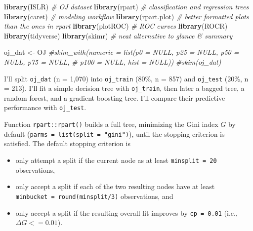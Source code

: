 \documentclass[
]{book}
\newenvironment{Shaded}{\begin{snugshade}}{\end{snugshade}}
\newcommand{\CommentTok}[1]{\textcolor[rgb]{0.56,0.35,0.01}{\textit{#1}}}
\newcommand{\DataTypeTok}[1]{\textcolor[rgb]{0.13,0.29,0.53}{#1}}
\newcommand{\DecValTok}[1]{\textcolor[rgb]{0.00,0.00,0.81}{#1}}
\newcommand{\FloatTok}[1]{\textcolor[rgb]{0.00,0.00,0.81}{#1}}
\newcommand{\KeywordTok}[1]{\textcolor[rgb]{0.13,0.29,0.53}{\textbf{#1}}}
\newcommand{\NormalTok}[1]{#1}
\newcommand{\OperatorTok}[1]{\textcolor[rgb]{0.81,0.36,0.00}{\textbf{#1}}}
\newcommand{\OtherTok}[1]{\textcolor[rgb]{0.56,0.35,0.01}{#1}}
\newcommand{\StringTok}[1]{\textcolor[rgb]{0.31,0.60,0.02}{#1}}
\providecommand{\tightlist}{%
  \setlength{\itemsep}{0pt}\setlength{\parskip}{0pt}}
\begin{document}
\begin{Shaded}
\begin{Highlighting}[]
\KeywordTok{library}\NormalTok{(ISLR)  }\CommentTok{# OJ dataset}
\KeywordTok{library}\NormalTok{(rpart)  }\CommentTok{# classification and regression trees }
\KeywordTok{library}\NormalTok{(caret)  }\CommentTok{# modeling workflow}
\KeywordTok{library}\NormalTok{(rpart.plot)  }\CommentTok{# better formatted plots than the ones in rpart}
\KeywordTok{library}\NormalTok{(plotROC)  }\CommentTok{# ROC curves}
\KeywordTok{library}\NormalTok{(ROCR)}
\KeywordTok{library}\NormalTok{(tidyverse)}
\KeywordTok{library}\NormalTok{(skimr)  }\CommentTok{# neat alternative to glance & summary}

\NormalTok{oj_dat <-}\StringTok{ }\NormalTok{OJ}
\CommentTok{#skim_with(numeric = list(p0 = NULL, p25 = NULL, p50 = NULL, p75 = NULL, }
\CommentTok{#                                p100 = NULL, hist = NULL))}
\CommentTok{#skim(oj_dat)}
\end{Highlighting}
\end{Shaded}

I'll split \texttt{oj\_dat} (n = 1,070) into \texttt{oj\_train} (80\%, n = 857) and \texttt{oj\_test} (20\%, n = 213). I'll fit a simple decision tree with \texttt{oj\_train}, then later a bagged tree, a random forest, and a gradient boosting tree. I'll compare their predictive performance with \texttt{oj\_test}.

\begin{Shaded}
\end{Shaded}

Function \texttt{rpart::rpart()} builds a full tree, minimizing the Gini index \(G\) by default (\texttt{parms\ =\ list(split\ =\ "gini")}), until the stopping criterion is satisfied. The default stopping criterion is

\begin{itemize}
\tightlist
\item
  only attempt a split if the current node as at least \texttt{minsplit\ =\ 20} observations,
\item
  only accept a split if each of the two resulting nodes have at least \texttt{minbucket\ =\ round(minsplit/3)} observations, and
\item
  only accept a split if the resulting overall fit improves by \texttt{cp\ =\ 0.01} (i.e., \(\Delta G <= 0.01\)).
\end{itemize}
\end{document}
